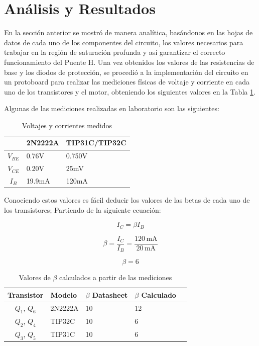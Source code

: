 \documentclass[journal]{IEEEtran}
\begin{document}
\section{Análisis y Resultados}
    En la sección anterior se mostró de manera analítica, basándonos en las hojas de datos de cada uno de los componentes del circuito, los valores necesarios para trabajar en la región de saturación profunda y así garantizar el correcto funcionamiento del Puente H.
    Una vez obtenidos los valores de las resistencias de base y los diodos de protección, se procedió a la implementación del circuito en un protoboard para realizar las mediciones físicas de voltaje y corriente en cada uno de los transistores y el motor, obteniendo los siguientes valores en la Tabla \ref{tabla:Valores_medidos}.

    Algunas de las mediciones realizadas en laboratorio son las siguientes:

    \begin{table}[H]
    \centering
    \small 
    \begin{tabularx}{\columnwidth}{|c|X|X|}
    \hline
    \textbf{} & \textbf{2N2222A} & \textbf{TIP31C/TIP32C}\\ \hline
    $V_{BE}$  & 0.76V & 0.750V\\ \hline
    $V_{CE}$  & 0.20V & 25mV\\ \hline
    $I_B$ & 19.9mA & 120mA \\ \hline
    \end{tabularx}
    \caption{Voltajes y corrientes medidos}
    \label{tabla:Valores_medidos}
    \end{table}

    Conociendo estos valores es fácil deducir los valores de las betas de cada uno de los transistores; Partiendo de la siguiente ecuación:


        \[
        I_C = \beta I_B
        \]

        \[
        \beta = \frac{I_C}{I_B}
            = \frac{120\,\mathrm{mA}}{20\,\mathrm{mA}}
        \]

        \[
        \beta = 6
        \]

    \begin{table}[H]
    \centering
    \small 
    \begin{tabularx}{\columnwidth}{|c|X|X|X|X|}
    \hline
    \textbf{Transistor} & \textbf{Modelo} & \textbf{$\beta$ Datasheet} & \textbf{$\beta$ Calculado}\\ \hline
    $Q_1$, $Q_6$  & 2N2222A & 10 & 12\\ \hline
    $Q_2$, $Q_4$  & TIP32C &  10 & 6 \\ \hline
    $Q_3$, $Q_5$  & TIP31C &  10 & 6 \\ \hline

    \end{tabularx}
    \caption{Valores de $\beta$ calculados a partir de las mediciones}
    \label{tabla:Valores_beta}
    \end{table}
\end{document}
